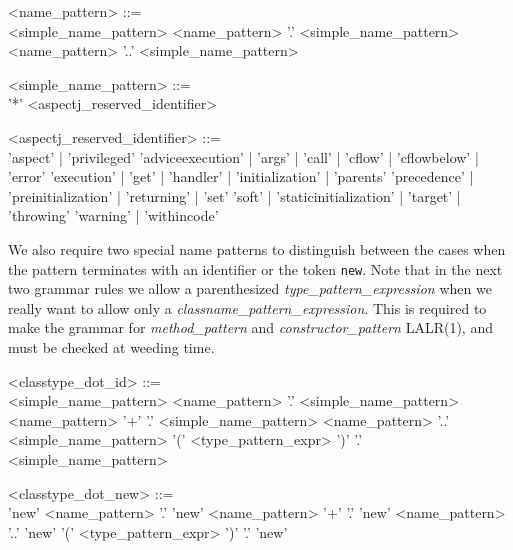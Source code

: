 \begin{minipage}{6in}
\begin{grammar}
\begin{blue}

<name_pattern> ::=  \hspace{1in} \\
      <simple_name_pattern>
\alt  <name_pattern> '.'  <simple_name_pattern>
\alt  <name_pattern> '..' <simple_name_pattern>

<simple_name_pattern> ::= \hspace{1in} \\
      '*'
\alt  <aspectj_reserved_identifier>

<aspectj_reserved_identifier> ::= \hspace{1in} \\
   'aspect' | 'privileged' 
\alt 'adviceexecution' | 'args' | 'call' | 'cflow' | 'cflowbelow' | 'error'
\alt 'execution' | 'get' | 'handler' | 'initialization' | 'parents' 
\alt 'precedence' | 'preinitialization' | 'returning' | 'set' 
\alt 'soft' | 'staticinitialization' | 'target' | 'throwing' 
\alt 'warning' | 'withincode'
\end{blue}
\end{grammar}
\end{minipage}

We also require two special name patterns to distinguish between the
cases when the pattern terminates with an identifier or the token {\tt new}.
Note that in the next two grammar rules we allow a parenthesized
{\em type\_pattern\_expression} when we really want to allow
only a {\em classname\_pattern\_expression}.   This is required 
to make the grammar for {\em method\_pattern} and {\em constructor_pattern}
LALR(1),  and must be checked at weeding time. 

\begin{minipage}{6in}
\begin{grammar}
\begin{blue}

<classtype_dot_id> ::= \hspace{1in} \\
      <simple_name_pattern>
\alt  <name_pattern> '.' <simple_name_pattern>
\alt  <name_pattern> '+' '.' <simple_name_pattern>
\alt  <name_pattern> '..' <simple_name_pattern>
\alt '(' <type_pattern_expr> ')' '.' <simple_name_pattern> 

<classtype_dot_new> ::= \hspace{1in} \\
\alt 'new'
\alt <name_pattern> '.' 'new'
\alt <name_pattern> '+' '.' 'new'
\alt <name_pattern> '..' 'new'
\alt '(' <type_pattern_expr> ')' '.' 'new'

\end{blue}
\end{grammar}
\end{minipage}

